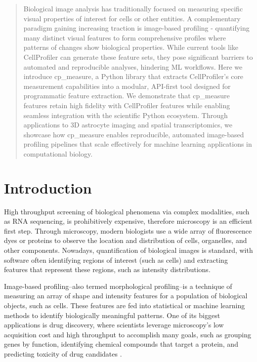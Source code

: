\documentclass{article}
\begin{document}
\begin{abstract}
Biological image analysis has traditionally focused on measuring specific visual properties of interest for cells or other entities. A complementary paradigm gaining increasing traction is image-based profiling - quantifying many distinct visual features to form comprehensive profiles where patterns of changes show biological properties. While current tools like CellProfiler can generate these feature sets, they pose significant barriers to automated and reproducible analyses, hindering ML workflows. Here we introduce cp\_measure, a Python library that extracts CellProfiler's core measurement capabilities into a modular, API-first tool designed for programmatic feature extraction. We demonstrate that cp\_measure features retain high fidelity with CellProfiler features while enabling seamless integration with the scientific Python ecosystem. Through applications to 3D astrocyte imaging and spatial transcriptomics, we showcase how cp\_measure enables reproducible, automated image-based profiling pipelines that scale effectively for machine learning applications in computational biology.
\end{abstract}

\section{Introduction}
\label{sec:org4c9ba67}
High throughput screening of biological phenomena via complex modalities, such as RNA sequencing, is prohibitively expensive, therefore microscopy is an efficient first step. Through microscopy, modern biologists use a wide array of fluorescence dyes or proteins to observe the location and distribution of cells, organelles, and other components. Nowadays, quantification of biological images is standard, with software often identifying regions of interest (such as cells) and extracting features that represent these regions, such as intensity distributions.

Image-based profiling--also termed morphological profiling--is a technique of measuring an array of shape and intensity features for a population of biological objects, such as cells. These features are fed into statistical or machine learning methods to identify biologically meaningful patterns. One of its biggest applications is drug discovery, where scientists leverage microscopy's low acquisition cost and high throughput to accomplish many goals, such as grouping genes by function, identifying chemical compounds that target a protein, and predicting toxicity of drug candidates \citep{sealDecadeSystematicReview2024}. 
\end{document}
